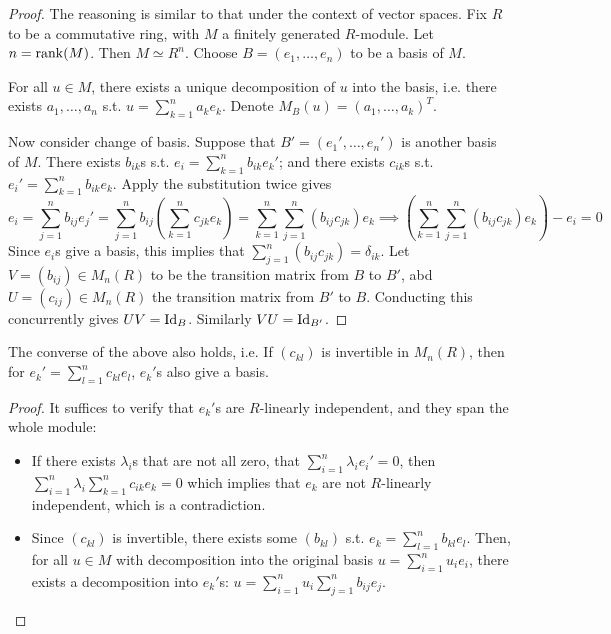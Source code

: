 \documentclass{article}
\begin{document}
\begin{proof}
    The reasoning is similar to that under the context of vector spaces. Fix $R$ to be a commutative ring, with $M$ a finitely generated $R$-module. Let $n = \mathrm{rank}(M)$. Then $M \simeq R^n$. Choose $B = (e_1, \ldots, e_n)$ to be a basis of $M$. 

    For all $u\in M$, there exists a unique decomposition of $u$ into the basis, i.e. there exists $a_1, \ldots, a_n$ s.t. $u = \sum_{k=1}^n a_k e_k$. Denote $M_B(u) = (a_1, \ldots, a_k)^T$. 

    Now consider change of basis. Suppose that $B' = (e_1', \ldots, e_n')$ is another basis of $M$. There exists $b_{ik}$s s.t. $e_i = \sum_{k=1}^n b_{ik} e_k'$; and there exists $c_{ik}$s s.t. $e_i' = \sum_{k=1}^n b_{ik} e_k$. Apply the substitution twice gives
    \[
        e_i = \sum\limits_{j=1}^n b_{ij} e_j' = \sum\limits_{j=1}^n b_{ij} \left( \sum\limits_{k=1}^n c_{jk} e_k \right) = \sum\limits_{k=1}^n \sum\limits_{j=1}^n (b_{ij} c_{jk}) e_k \implies \left(\sum\limits_{k=1}^n \sum\limits_{j=1}^n (b_{ij} c_{jk}) e_k\right) - e_i = 0
    \]
    Since $e_i$s give a basis, this implies that $\sum_{j=1}^n (b_{ij} c_{jk}) = \delta_{ik}$. Let $V = (b_{ij}) \in M_n(R)$ to be the transition matrix from $B$ to $B'$, abd $U = (c_{ij}) \in M_n(R)$ the transition matrix from $B'$ to $B$. Conducting this concurrently gives $UV = \mathrm{Id}_{B}$. Similarly $VU = \mathrm{Id}_{B'}$.
\end{proof}

\begin{proposition}
    The converse of the above also holds, i.e. If $(c_{kl})$ is invertible in $M_n(R)$, then for $e_k' = \sum_{l=1}^n c_{kl} e_l$, $e_k'$s also give a basis. 
\end{proposition}

\begin{proof}
    It suffices to verify that $e_k'$s are $R$-linearly independent, and they span the whole module:
    \begin{itemize}
        \item If there exists $\lambda_i$s that are not all zero, that $\sum_{i=1}^n \lambda_i e_i' = 0$, then $\sum_{i=1}^n \lambda_i \sum_{k=1}^n c_{ik} e_k = 0$ which implies that $e_k$ are not $R$-linearly independent, which is a contradiction.
        \item Since $(c_{kl})$ is invertible, there exists some $(b_{kl})$ s.t. $e_k = \sum_{l=1}^n b_{kl} e_l$. Then, for all $u\in M$ with decomposition into the original basis $u = \sum_{i=1}^n u_i e_i$, there exists a decomposition into $e_k'$s: $u = \sum_{i=1}^n u_i \sum_{j=1}^n b_{ij} e_j$. 
    \end{itemize}
\end{proof}
\end{document}
